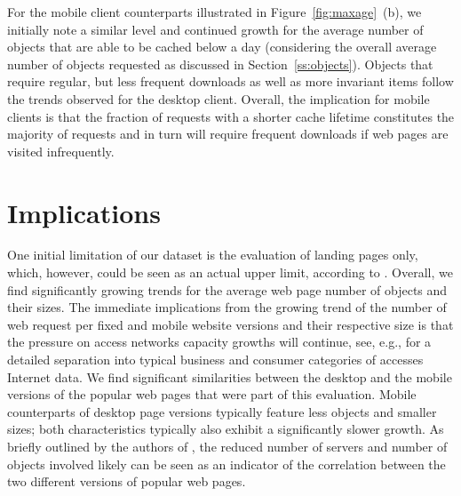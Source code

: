 \documentclass[journal,final]{IEEEtran}
\begin{document}
For the mobile client counterparts illustrated in Figure~\ref{fig:maxage}~(b), we initially note a similar level and continued growth for the average number of objects that are able to be cached below a day (considering the overall average number of objects requested as discussed in Section~\ref{ss:objects}).
Objects that require regular, but less frequent downloads as well as more invariant items follow the trends observed for the desktop client.
Overall, the implication for mobile clients is that the fraction of requests with a shorter cache lifetime constitutes the majority of requests and in turn will require frequent downloads if web pages are visited infrequently.


\section{Implications}
\label{s:discuss}
One initial limitation of our dataset is the evaluation of landing pages only, which, however, could be seen as an actual upper limit, according to \cite{BuMaSe13}. 
Overall, we find significantly growing trends for the average web page number of objects and their sizes.
The immediate implications from the growing trend of the number of web request per fixed and mobile website versions and their respective size is that the pressure on access networks capacity growths will continue, see, e.g., \cite{Ci13} for a detailed separation into typical business and consumer categories of accesses Internet data.
We find significant similarities between the desktop and the mobile versions of the popular web pages that were part of this evaluation. 
Mobile counterparts of desktop page versions typically feature less objects and smaller sizes; both characteristics typically also exhibit a significantly slower growth.
As briefly outlined by the authors of \cite{BuMaSe13}, the reduced number of servers and number of objects involved likely can be seen as an indicator of the correlation between the two different versions of popular web pages.
\end{document}
